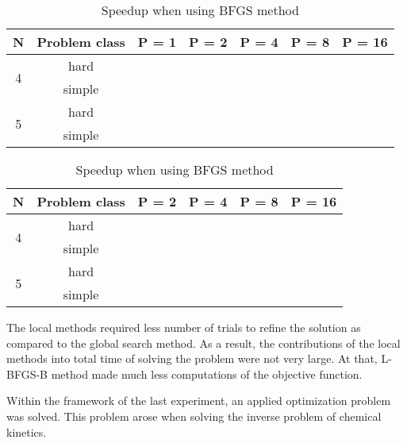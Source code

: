 \documentclass[runningheads]{llncs}
\begin{document}
\begin{table}[ht]
	\caption{Speedup when using BFGS method}
	\label{tab:9}
	\center
	\begin{tabular}{|c|c|c|c|c|c|c|}
		\hline
		N & Problem class & P = 1 & P = 2 & P = 4 & P = 8 & P = 16 \\
		\hline 
		    \multirow{2}{*}{4} & hard &  &  &  &  &  \\ \cline{2-7}
		                       & simple &  &  &  &  &  \\
		\hline
		    \multirow{2}{*}{5} & hard &  &  &  &  &  \\ \cline{2-7}
		                       & simple &  &  &  &  &  \\
		\hline
	\end{tabular}
\end{table}

\begin{table}[ht]
	\caption{Speedup when using BFGS method}
	\label{tab:10}
	\center
	\begin{tabular}{|c|c|c|c|c|c|}
		\hline
		N & Problem class  & P = 2 & P = 4 & P = 8 & P = 16 \\
		\hline 
		    \multirow{2}{*}{4} & hard &  &  &  &  \\ \cline{2-6}
		                       & simple &  &  &  &  \\
		\hline
		    \multirow{2}{*}{5} & hard &  &  &  &  \\ \cline{2-6}
		                       & simple &  &  &  &  \\
		\hline
	\end{tabular}
\end{table}

The local methods required less number of trials to refine the solution as compared to the global search method. As a result, the contributions of the local methods into total time of solving the problem were not very large. At that, L-BFGS-B method made much less computations of the objective function.

Within the framework of the last experiment, an applied optimization problem was solved. This problem arose when solving the inverse problem of chemical kinetics.
\end{document}
